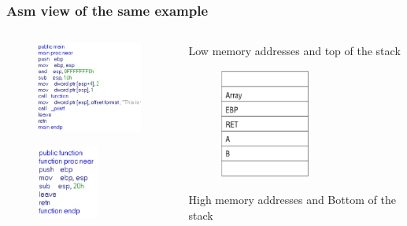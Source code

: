 \documentclass[]{beamer}
\begin{document}
      \begin{frame}
        \frametitle{Asm view of the same example}
        \begin{columns}
            \begin{column}{2.5in}
            	\hspace*{1cm} 
                \begin{figure}\flushleft
                    \includegraphics[width=4cm]{images/ida_main.eps}
                \end{figure}
                \hspace*{1cm} 
                \begin{figure}\flushleft
                    \includegraphics[width=2cm]{images/ida_function.eps}
                \end{figure}

            \end{column}
            \begin{column}{2.5in}
            \vspace{0.7cm}
            {\centering\tiny Low memory addresses and top of the stack \par}
               \begin{figure}
                  \includegraphics[width=3cm]{images/stack_after_call.eps}
               
               \end{figure}
                 {\centering\tiny High memory addresses and Bottom of the stack\par}
            \end{column}
        \end{columns}
        \begin{figure}
        \end{figure}
        
     \end{frame}
\end{document}
